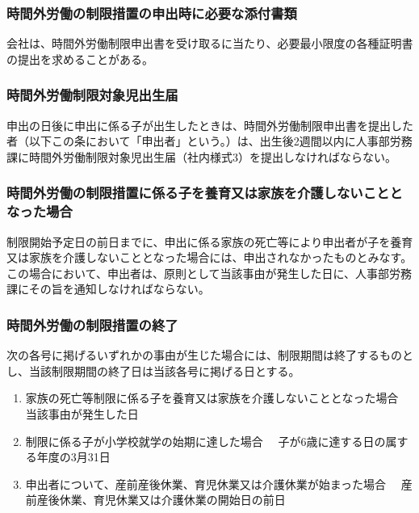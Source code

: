 \documentclass{jsarticle}
\begin{document}
\subsubsection{時間外労働の制限措置の申出時に必要な添付書類}
\label{育介_項_時間外労働の制限措置の申出時に必要な添付書類}
会社は、時間外労働制限申出書を受け取るに当たり、必要最小限度の各種証明書の提出を求めることがある。 

\subsubsection{時間外労働制限対象児出生届}
\label{育介_項_時間外労働制限対象児出生届}
申出の日後に申出に係る子が出生したときは、時間外労働制限申出書を提出した者（以下この条において「申出者」という。）は、出生後2週間以内に人事部労務課に時間外労働制限対象児出生届（社内様式3）を提出しなければならない。 

\subsubsection{時間外労働の制限措置に係る子を養育又は家族を介護しないこととなった場合}
\label{育介_項_時間外労働の制限措置に係る子を養育又は家族を介護しないこととなった場合}
制限開始予定日の前日までに、申出に係る家族の死亡等により申出者が子を養育又は家族を介護しないこととなった場合には、申出されなかったものとみなす。この場合において、申出者は、原則として当該事由が発生した日に、人事部労務課にその旨を通知しなければならない。

\subsubsection{時間外労働の制限措置の終了}
\label{育介_項_時間外労働の制限措置の終了}
次の各号に掲げるいずれかの事由が生じた場合には、制限期間は終了するものとし、当該制限期間の終了日は当該各号に掲げる日とする。 
\begin{enumerate}
  \item 家族の死亡等制限に係る子を養育又は家族を介護しないこととなった場合\label{enum:育介_項_時間外労働の制限措置の終了_子・家族の死亡等}
        　当該事由が発生した日 
  \item 制限に係る子が小学校就学の始期に達した場合
        　子が6歳に達する日の属する年度の3月31日 
  \item 申出者について、産前産後休業、育児休業又は介護休業が始まった場合
        　産前産後休業、育児休業又は介護休業の開始日の前日 
\end{enumerate}
\end{document}
